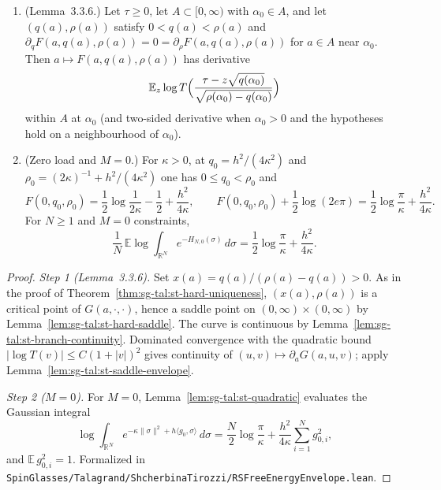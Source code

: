 \begin{lemma}[Derivative of $\mathrm{RS}_0(\alpha)$ and the $M=0$ free energy]\label{lem:sg-tal:st-rs-envelope}
  \leanok
\begin{enumerate}
\item (Lemma~3.3.6.) Let $\tau\ge0$, let $A\subset[0,\infty)$ with $\alpha_0\in A$, and let $(q(a),\rho(a))$
satisfy $0<q(a)<\rho(a)$ and
$\partial_q F(a,q(a),\rho(a))=0=\partial_\rho F(a,q(a),\rho(a))$ for $a\in A$ near $\alpha_0$. Then
$a\mapsto F(a,q(a),\rho(a))$ has derivative
\[
\mathbb E_z\log T\Bigl(\frac{\tau-z\sqrt{q(\alpha_0)}}{\sqrt{\rho(\alpha_0)-q(\alpha_0)}}\Bigr)
\]
within $A$ at $\alpha_0$ (and two-sided derivative when $\alpha_0>0$ and the hypotheses hold on a neighbourhood of
$\alpha_0$).
\item (Zero load and $M=0$.) For $\kappa>0$, at $q_0=h^2/(4\kappa^2)$ and $\rho_0=(2\kappa)^{-1}+h^2/(4\kappa^2)$
one has $0\le q_0<\rho_0$ and
\[
F(0,q_0,\rho_0)=\frac12\log\frac1{2\kappa}-\frac12+\frac{h^2}{4\kappa},\qquad
F(0,q_0,\rho_0)+\frac12\log(2e\pi)=\frac12\log\frac\pi\kappa+\frac{h^2}{4\kappa}.
\]
For $N\ge1$ and $M=0$ constraints,
\[
\frac1N\,\mathbb E\log\int_{\mathbb R^N}e^{-H_{N,0}(\sigma)}\,d\sigma
=\frac12\log\frac\pi\kappa+\frac{h^2}{4\kappa}.
\]
\end{enumerate}
\end{lemma}
\begin{proof}
  \leanok
\emph{Step 1 (Lemma~3.3.6).} Set $x(a)=q(a)/(\rho(a)-q(a))>0$. As in the proof of
Theorem~\ref{thm:sg-tal:st-hard-uniqueness}, $(x(a),\rho(a))$ is a critical point of $G(a,\cdot,\cdot)$, hence a
saddle point on $(0,\infty)\times(0,\infty)$ by Lemma~\ref{lem:sg-tal:st-hard-saddle}. The curve is
continuous by Lemma~\ref{lem:sg-tal:st-branch-continuity}. Dominated convergence with the
quadratic bound $|\log T(v)|\le C(1+|v|)^2$ gives continuity of $(u,v)\mapsto\partial_a G(a,u,v)$; apply
Lemma~\ref{lem:sg-tal:st-saddle-envelope}.

\emph{Step 2 ($M=0$).} For $M=0$, Lemma~\ref{lem:sg-tal:st-quadratic} evaluates the Gaussian integral
\[
\log\int_{\mathbb R^N}e^{-\kappa\|\sigma\|^2+h\langle g_0,\sigma\rangle}\,d\sigma
=\frac N2\log\frac\pi\kappa+\frac{h^2}{4\kappa}\sum_{i=1}^N g_{0,i}^2,
\]
and $\mathbb E\,g_{0,i}^2=1$.
Formalized in \texttt{SpinGlasses/Talagrand/ShcherbinaTirozzi/RSFreeEnergyEnvelope.lean}.
\end{proof}

